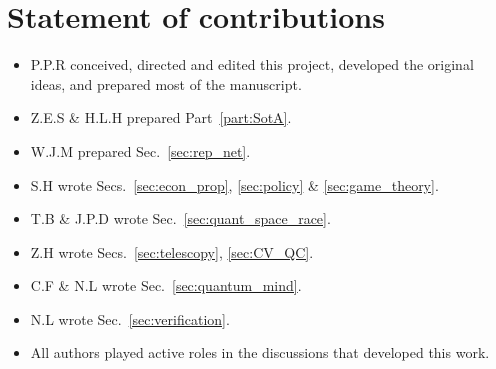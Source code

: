 %
%

\section*{Statement of contributions}

\begin{itemize}
\item P.P.R conceived, directed and edited this project, developed the original ideas, and prepared most of the manuscript.
\item Z.E.S \& H.L.H prepared Part~\ref{part:SotA}.
\item W.J.M prepared Sec.~\ref{sec:rep_net}. 
\item S.H wrote Secs.~\ref{sec:econ_prop}, \ref{sec:policy} \& \ref{sec:game_theory}.
\item T.B \& J.P.D wrote Sec.~\ref{sec:quant_space_race}.
\item Z.H wrote Secs.~\ref{sec:telescopy}, \ref{sec:CV_QC}.
\item C.F \& N.L wrote Sec.~\ref{sec:quantum_mind}.
\item N.L wrote Sec.~\ref{sec:verification}.
\item All authors played active roles in the discussions that developed this work. 
\end{itemize}

